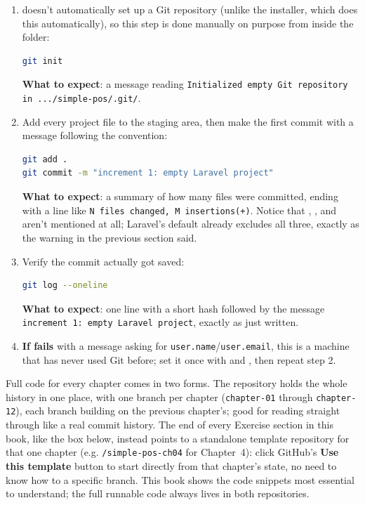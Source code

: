 \begin{enumerate}
  \item {} doesn't automatically set up a Git
    repository (unlike the  installer, which does this
    automatically), so this step is done manually on purpose from inside
    the  folder:
    \begin{lstlisting}[language=bash]
git init
    \end{lstlisting}
    \textbf{What to expect}: a message reading \texttt{Initialized empty
    Git repository in .../simple-pos/.git/}.
  \item Add every project file to the staging area, then make the first
    commit with a message following the  convention:
    \begin{lstlisting}[language=bash]
git add .
git commit -m "increment 1: empty Laravel project"
    \end{lstlisting}
    \textbf{What to expect}: a summary of how many files were committed,
    ending with a line like \texttt{N files changed, M insertions(+)}.
    Notice that , , and 
    aren't mentioned at all; Laravel's default  already
    excludes all three, exactly as the warning in the previous section
    said.
  \item Verify the commit actually got saved:
    \begin{lstlisting}[language=bash]
git log --oneline
    \end{lstlisting}
    \textbf{What to expect}: one line with a short hash followed by the
    message \texttt{increment 1: empty Laravel project}, exactly as just
    written.
  \item \textbf{If  fails} with a message asking for
    \texttt{user.name}/\texttt{user.email}, this is a machine that has
    never used Git before; set it once with
     and
    , then repeat
    step 2.
\end{enumerate}

\begin{tipbox}
Full code for every chapter comes in two forms. The
\texttt{\repobase} repository holds the whole history in one place, with
one branch per chapter (\texttt{chapter-01} through \texttt{chapter-12}),
each branch building on the previous chapter's; good for reading straight
through like a real commit history. The end of every Exercise section in
this book, like the box below, instead points to a standalone template
repository for that one chapter (e.g. \texttt{\repoowner/simple-pos-ch04}
for Chapter~4): click GitHub's \textbf{Use this template} button to start
directly from that chapter's state, no need to know how to
 a specific branch. This book shows the code snippets
most essential to understand; the full runnable code always lives in
both repositories.
\end{tipbox}

